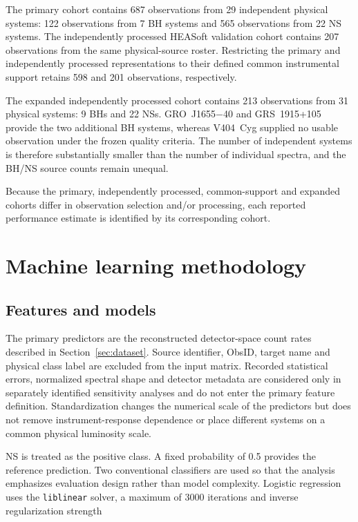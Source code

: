 \documentclass[final,5p,authoryear,nopreprintline]{elsarticle}
\begin{document}
The primary cohort contains 687 observations from 29 independent physical systems: 122 observations from 7 BH systems and 565 observations from 22 NS systems. The independently processed HEASoft validation cohort contains 207 observations from the same physical-source roster. Restricting the primary and independently processed representations to their defined common instrumental support retains 598 and 201 observations, respectively.

The expanded independently processed cohort contains 213 observations from 31 physical systems: 9 BHs and 22 NSs. GRO~J1655$-$40 and GRS~1915+105 provide the two additional BH systems, whereas V404~Cyg supplied no usable observation under the frozen quality criteria. The number of independent systems is therefore substantially smaller than the number of individual spectra, and the BH/NS source counts remain unequal.

Because the primary, independently processed, common-support and expanded cohorts differ in observation selection and/or processing, each reported performance estimate is identified by its corresponding cohort.

\section{Machine learning methodology}
\label{sec:4}

\subsection{Features and models}

The primary predictors are the reconstructed detector-space count rates described in Section~\ref{sec:dataset}. Source identifier, ObsID, target name and physical class label are excluded from the input matrix. Recorded statistical errors, normalized spectral shape and detector metadata are considered only in separately identified sensitivity analyses and do not enter the primary feature definition. Standardization changes the numerical scale of the predictors but does not remove instrument-response dependence or place different systems on a common physical luminosity scale.

NS is treated as the positive class. A fixed probability of 0.5 provides the reference prediction. Two conventional classifiers are used so that the analysis emphasizes evaluation design rather than model complexity. Logistic regression uses the \texttt{liblinear} solver, a maximum of 3000 iterations and inverse regularization strength
\end{document}
